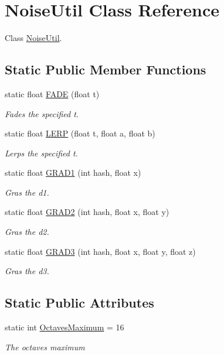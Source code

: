 \hypertarget{class_noise_util}{}\section{Noise\+Util Class Reference}
\label{class_noise_util}


Class \hyperlink{class_noise_util}{Noise\+Util}.  


\subsection*{Static Public Member Functions}
\begin{DoxyCompactItemize}
\item 
static float \hyperlink{class_noise_util_a0b86dd13deace2f2e95c562f1d123d61}{F\+A\+DE} (float t)
\begin{DoxyCompactList}\small\item\em Fades the specified t. \end{DoxyCompactList}\item 
static float \hyperlink{class_noise_util_ae03f5fa651180f0aa22c9ed54baf6c50}{L\+E\+RP} (float t, float a, float b)
\begin{DoxyCompactList}\small\item\em Lerps the specified t. \end{DoxyCompactList}\item 
static float \hyperlink{class_noise_util_a953eb5cfd98c62cade6658e8daf9c19c}{G\+R\+A\+D1} (int hash, float x)
\begin{DoxyCompactList}\small\item\em Gras the d1. \end{DoxyCompactList}\item 
static float \hyperlink{class_noise_util_a4464da19a847e00a3da1c4ba67b9e346}{G\+R\+A\+D2} (int hash, float x, float y)
\begin{DoxyCompactList}\small\item\em Gras the d2. \end{DoxyCompactList}\item 
static float \hyperlink{class_noise_util_a1ff08c1b69b5696273722a486751bde0}{G\+R\+A\+D3} (int hash, float x, float y, float z)
\begin{DoxyCompactList}\small\item\em Gras the d3. \end{DoxyCompactList}\end{DoxyCompactItemize}
\subsection*{Static Public Attributes}
\begin{DoxyCompactItemize}
\item 
static int \hyperlink{class_noise_util_ade7e89a74f0997ca095b1fa017e30a03}{Octaves\+Maximum} = 16
\begin{DoxyCompactList}\small\item\em The octaves maximum \end{DoxyCompactList}\end{DoxyCompactItemize}


